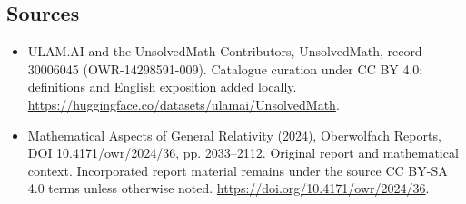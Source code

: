 \documentclass[11pt]{article}
\begin{document}
\subsection{Sources}
\begin{itemize}
\item[\hypertarget{source:30006045:1}{S1}] ULAM.AI and the UnsolvedMath Contributors, UnsolvedMath, record 30006045 (OWR-14298591-009). Catalogue curation under CC BY 4.0; definitions and English exposition added locally.
\url{https://huggingface.co/datasets/ulamai/UnsolvedMath}.
\item[\hypertarget{source:30006045:2}{S2}] Mathematical Aspects of General Relativity (2024), Oberwolfach Reports, DOI 10.4171/owr/2024/36, pp. 2033--2112. Original report and mathematical context. Incorporated report material remains under the source CC BY-SA 4.0 terms unless otherwise noted.
\url{https://doi.org/10.4171/owr/2024/36}.
\end{itemize}
\label{end:30006045}
\end{document}
